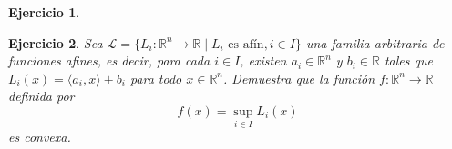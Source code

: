\documentclass[11pt]{report}
\newtheorem{ex}{Ejercicio}
\begin{document}
\begin{ex}
\end{ex}

\begin{ex}
  Sea \( \mathcal{L} = \{L_i: \mathbb{R}^n \to \mathbb{R} \mid L_i \text{ es afín}, i \in I\} \) una familia arbitraria de funciones afines, es decir, para cada \( i \in I \), existen \( a_i \in \mathbb{R}^n \) y \( b_i \in \mathbb{R} \) tales que \( L_i(x) = \langle a_i, x \rangle + b_i \) para todo \( x \in \mathbb{R}^n \).
Demuestra que la función \( f: \mathbb{R}^n \to \mathbb{R} \) definida por
      \[
      f(x) = \sup_{i \in I} L_i(x)
      \]
      es convexa.






\end{ex}
\end{document}
